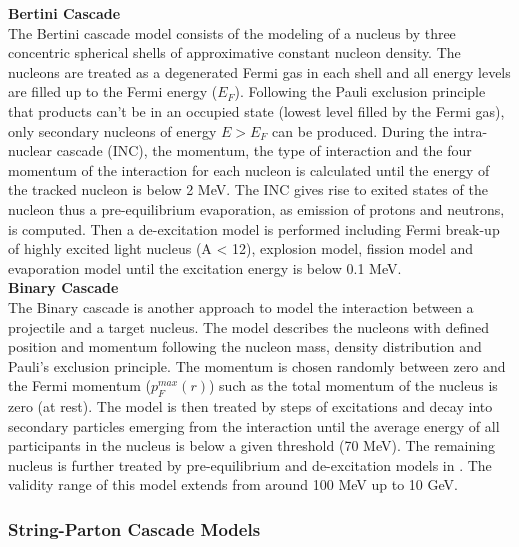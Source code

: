 \textbf{Bertini Cascade}\\

The Bertini cascade model \cite{Heikkinen2003} consists of the modeling of a nucleus by three concentric spherical shells of approximative constant nucleon density. The nucleons are treated as a degenerated Fermi gas in each shell and all energy levels are filled up to the Fermi energy ($E_F$). Following the Pauli exclusion principle that products can't be in an occupied state (lowest level filled by the Fermi gas), only secondary nucleons of energy $E > E_F$ can be produced. During the intra-nuclear cascade (INC), the momentum, the type of interaction and the four momentum of the interaction for each nucleon is calculated until the energy of the tracked nucleon is below 2 MeV. The INC gives rise to exited states of the nucleon thus a pre-equilibrium evaporation, as emission of protons and neutrons, is computed. Then a de-excitation model is performed including Fermi break-up of highly excited light nucleus (A < 12), explosion model, fission model and evaporation model until the excitation energy is below 0.1 MeV.\\

\textbf{Binary Cascade}\\

The Binary cascade \cite{Folger2004} is another approach to model the interaction between a projectile and a target nucleus. The model describes the nucleons with defined position and momentum following the nucleon mass, density distribution and Pauli's exclusion principle. The momentum is chosen randomly between zero and the Fermi momentum ($p_{F}^{max}(r)$) such as the total momentum of the nucleus is zero (at rest). The model is then treated by steps of excitations and decay into secondary particles emerging from the interaction until the average energy of all participants in the nucleus is below a given threshold (70 MeV). The remaining nucleus is further treated by pre-equilibrium and de-excitation models in \geant. The validity range of this model extends from around 100 MeV up to 10 GeV.

\subsubsection{String-Parton Cascade Models}

